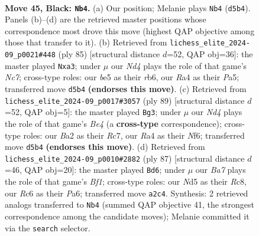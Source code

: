 \documentclass[11pt]{article}
\begin{document}
\clearpage

\begin{figure}[p]\centering
\begin{subfigure}{0.46\textwidth}\centering
\resizebox{\linewidth}{!}{%
\newchessgame
\chessboard[
  setfen={5k2/3R4/2r5/1p1nB1p1/r7/4P1PP/b4P2/4R1K1 b - - 0 45},
  showmover=false,
  pgfstyle=straightmove, color=movearrow, markmove={d5-b4}
]}
\caption{}
\end{subfigure}\hfill
\begin{subfigure}{0.46\textwidth}\centering
\resizebox{\linewidth}{!}{%
\newchessgame
\chessboard[
  setfen={5k2/8/1R6/p3bBN1/5p2/P1r4P/2n2PP1/6K1 b - - 0 43},
  showmover=false,
  pgfstyle=straightmove, color=movearrow, markmove={c2-a3}
]}
\caption{}
\end{subfigure}
\\[4pt]
\begin{subfigure}{0.46\textwidth}\centering
\resizebox{\linewidth}{!}{%
\newchessgame
\chessboard[
  setfen={3R4/2r3k1/5nP1/4b3/1p5p/3B3P/P5P1/3R2K1 b - - 3 45},
  showmover=false,
  pgfstyle=straightmove, color=movearrow, markmove={e5-g3}
]}
\caption{}
\end{subfigure}\hfill
\begin{subfigure}{0.46\textwidth}\centering
\resizebox{\linewidth}{!}{%
\newchessgame
\chessboard[
  setfen={2r2b2/2P4R/p3k1p1/B2n4/1p4PP/1P3P2/P7/6K1 b - - 2 44},
  showmover=false,
  pgfstyle=straightmove, color=movearrow, markmove={f8-d6}
]}
\caption{}
\end{subfigure}
\caption{\textbf{Move 45, Black: \texttt{Nb4}.} (a) Our position; Melanie plays \texttt{Nb4} (\texttt{d5b4}). Panels (b)--(d) are the retrieved master positions whose correspondence most drove this move (highest QAP objective among those that transfer to it). (b) Retrieved from \texttt{lichess\_elite\_2024-09\_p0021\#448} (ply 85) [structural distance $d$=52, QAP obj=36]: the master played \texttt{Nxa3}; under $\mu$ our \emph{Nd4} plays the role of that game's \emph{Nc7}; cross-type roles: our \emph{b}e5 as their \emph{r}b6, our \emph{R}a4 as their \emph{P}a5; transferred move \texttt{d5b4} \textbf{(endorses this move)}. (c) Retrieved from \texttt{lichess\_elite\_2024-09\_p0017\#3057} (ply 89) [structural distance $d$=52, QAP obj=5]: the master played \texttt{Bg3}; under $\mu$ our \emph{Nd4} plays the role of that game's \emph{Be4} (a \textbf{cross-type} correspondence); cross-type roles: our \emph{B}a2 as their \emph{R}c7, our \emph{R}a4 as their \emph{N}f6; transferred move \texttt{d5b4} \textbf{(endorses this move)}. (d) Retrieved from \texttt{lichess\_elite\_2024-09\_p0010\#2882} (ply 87) [structural distance $d$=46, QAP obj=20]: the master played \texttt{Bd6}; under $\mu$ our \emph{Ba7} plays the role of that game's \emph{Bf1}; cross-type roles: our \emph{N}d5 as their \emph{R}c8, our \emph{R}c6 as their \emph{P}a6; transferred move \texttt{a2c4}. Synthesis: 2 retrieved analogs transferred to \texttt{Nb4} (summed QAP objective 41, the strongest correspondence among the candidate moves); Melanie committed it via the \texttt{search} selector.}
\label{fig:thought-m89}
\end{figure}
\end{document}
